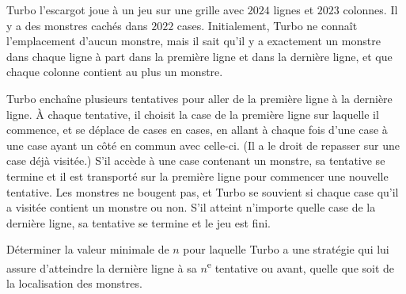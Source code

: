 Turbo l'escargot joue à un jeu sur une grille avec $2024$ lignes et $2023$ colonnes. Il y a des monstres
cachés dans $2022$ cases. Initialement, Turbo ne connaît l'emplacement d'aucun monstre, mais il sait qu'il
y a exactement un monstre dans chaque ligne à part dans la première ligne et dans la dernière ligne, et que
chaque colonne contient au plus un monstre.

Turbo enchaîne plusieurs tentatives pour aller de la première ligne à la dernière ligne. À chaque tentative,
il choisit la case de la première ligne sur laquelle il commence, et se déplace de cases en cases, en allant
à chaque fois d'une case à une case ayant un côté en commun avec celle-ci. (Il a le droit de repasser sur une
case déjà visitée.) S'il accède à une case contenant un monstre, sa tentative se termine et il est transporté
sur la première ligne pour commencer une nouvelle tentative. Les monstres ne bougent pas, et Turbo se
souvient si chaque case qu'il a visitée contient un monstre ou non. S'il atteint n'importe quelle case de la
dernière ligne, sa tentative se termine et le jeu est fini.

Déterminer la valeur minimale de $n$ pour laquelle Turbo a une stratégie qui lui assure d'atteindre la
dernière ligne à sa $n$\textsuperscript{e} tentative ou avant, quelle que soit de la localisation des monstres.
